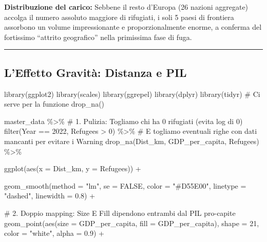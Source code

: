 \documentclass[
  letterpaper,
  DIV=11,
  numbers=noendperiod]{scrartcl}
\newenvironment{Shaded}{\begin{snugshade}}{\end{snugshade}}
\newcommand{\AttributeTok}[1]{\textcolor[rgb]{0.40,0.45,0.13}{#1}}
\newcommand{\CommentTok}[1]{\textcolor[rgb]{0.37,0.37,0.37}{#1}}
\newcommand{\ConstantTok}[1]{\textcolor[rgb]{0.56,0.35,0.01}{#1}}
\newcommand{\DecValTok}[1]{\textcolor[rgb]{0.68,0.00,0.00}{#1}}
\newcommand{\FloatTok}[1]{\textcolor[rgb]{0.68,0.00,0.00}{#1}}
\newcommand{\FunctionTok}[1]{\textcolor[rgb]{0.28,0.35,0.67}{#1}}
\newcommand{\NormalTok}[1]{\textcolor[rgb]{0.00,0.23,0.31}{#1}}
\newcommand{\SpecialCharTok}[1]{\textcolor[rgb]{0.37,0.37,0.37}{#1}}
\newcommand{\StringTok}[1]{\textcolor[rgb]{0.13,0.47,0.30}{#1}}
\begin{document}
\textbf{Distribuzione del carico:} Sebbene il resto d'Europa (26 nazioni
aggregate) accolga il numero assoluto maggiore di rifugiati, i soli 5
paesi di frontiera assorbono un volume impressionante e
proporzionalmente enorme, a conferma del fortissimo ``attrito
geografico'' nella primissima fase di fuga.

\begin{center}\rule{0.5\linewidth}{0.5pt}\end{center}

\subsection{L'Effetto Gravità: Distanza e
PIL}\label{leffetto-gravituxe0-distanza-e-pil}

\begin{Shaded}
\begin{Highlighting}[]
\FunctionTok{library}\NormalTok{(ggplot2)}
\FunctionTok{library}\NormalTok{(scales)}
\FunctionTok{library}\NormalTok{(ggrepel)}
\FunctionTok{library}\NormalTok{(dplyr)}
\FunctionTok{library}\NormalTok{(tidyr) }\CommentTok{\# Ci serve per la funzione drop\_na()}

\NormalTok{master\_data }\SpecialCharTok{\%\textgreater{}\%}
  \CommentTok{\# 1. Pulizia: Togliamo chi ha 0 rifugiati (evita log di 0) }
  \FunctionTok{filter}\NormalTok{(Year }\SpecialCharTok{==} \DecValTok{2022}\NormalTok{, Refugees }\SpecialCharTok{\textgreater{}} \DecValTok{0}\NormalTok{) }\SpecialCharTok{\%\textgreater{}\%}
  \CommentTok{\# E togliamo eventuali righe con dati mancanti per evitare i Warning}
  \FunctionTok{drop\_na}\NormalTok{(Dist\_km, GDP\_per\_capita, Refugees) }\SpecialCharTok{\%\textgreater{}\%}
  
  \FunctionTok{ggplot}\NormalTok{(}\FunctionTok{aes}\NormalTok{(}\AttributeTok{x =}\NormalTok{ Dist\_km, }\AttributeTok{y =}\NormalTok{ Refugees)) }\SpecialCharTok{+}
  
  \FunctionTok{geom\_smooth}\NormalTok{(}\AttributeTok{method =} \StringTok{"lm"}\NormalTok{, }\AttributeTok{se =} \ConstantTok{FALSE}\NormalTok{, }\AttributeTok{color =} \StringTok{"\#D55E00"}\NormalTok{, }\AttributeTok{linetype =} \StringTok{"dashed"}\NormalTok{, }\AttributeTok{linewidth =} \FloatTok{0.8}\NormalTok{) }\SpecialCharTok{+}
  
  \CommentTok{\# 2. Doppio mapping: Size E Fill dipendono entrambi dal PIL pro{-}capite}
  \FunctionTok{geom\_point}\NormalTok{(}\FunctionTok{aes}\NormalTok{(}\AttributeTok{size =}\NormalTok{ GDP\_per\_capita, }\AttributeTok{fill =}\NormalTok{ GDP\_per\_capita), }
             \AttributeTok{shape =} \DecValTok{21}\NormalTok{, }\AttributeTok{color =} \StringTok{"white"}\NormalTok{, }\AttributeTok{alpha =} \FloatTok{0.9}\NormalTok{) }\SpecialCharTok{+}
  

\end{Highlighting}
\end{Shaded}
\end{document}
